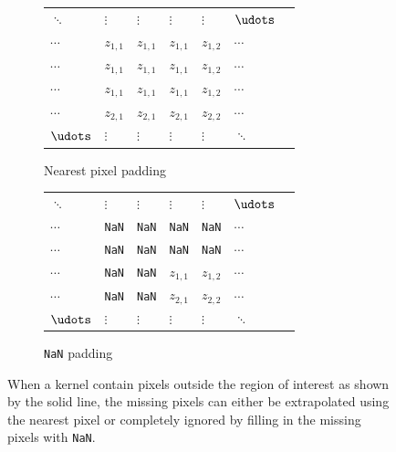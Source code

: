 \begin{figure}
	\centering
	\begin{subfigure}[b]{0.49\textwidth}
	    \begin{tabular}{lllllll}
	       $\ddots$ & $\vdots$ & $\vdots$ & $\vdots$ & $\vdots$ & $\udots$ \\
	       $\cdots$ & $z_{1,1}$ & $z_{1,1}$ & $z_{1,1}$ & $z_{1,2}$ & $\cdots$ \\
	       $\cdots$ & $z_{1,1}$ & $z_{1,1}$ & $z_{1,1}$ & $z_{1,2}$ & $\cdots$ \\ \cline{4-6}
	       $\cdots$ & $z_{1,1}$ & \multicolumn{1}{l|}{$z_{1,1}$} & $z_{1,1}$ & $z_{1,2}$ & $\cdots$ \\
	       $\cdots$ & $z_{2,1}$ & \multicolumn{1}{l|}{$z_{2,1}$}  & $z_{2,1}$ & $z_{2,2}$ & $\cdots$ \\
	       $\udots$ & $\vdots$ & \multicolumn{1}{l|}{$\vdots$}  & $\vdots$ & $\vdots$ & $\ddots$
		\end{tabular}
		\caption{Nearest pixel padding}
		\label{fig:inference_padding_nearest}
	\end{subfigure}
	\begin{subfigure}[b]{0.49\textwidth}
	    \begin{tabular}{lllllll}
	       $\ddots$ & $\vdots$ & $\vdots$ & $\vdots$ & $\vdots$ & $\udots$ \\
	       $\cdots$ & \texttt{NaN} & \texttt{NaN} & \texttt{NaN} & \texttt{NaN} & $\cdots$ \\
	       $\cdots$ & \texttt{NaN} & \texttt{NaN} & \texttt{NaN} & \texttt{NaN} & $\cdots$ \\ \cline{4-6}
	       $\cdots$ & \texttt{NaN} & \multicolumn{1}{l|}{\texttt{NaN}} & $z_{1,1}$ & $z_{1,2}$ & $\cdots$ \\
	       $\cdots$ & \texttt{NaN} & \multicolumn{1}{l|}{\texttt{NaN}}  & $z_{2,1}$ & $z_{2,2}$ & $\cdots$ \\
	       $\udots$ & $\vdots$ & \multicolumn{1}{l|}{$\vdots$}  & $\vdots$ & $\vdots$ & $\ddots$
		\end{tabular}
		\caption{\texttt{NaN} padding}
		\label{fig:inference_padding_nan}
	\end{subfigure}
	\caption{When a kernel contain pixels outside the region of interest as shown by the solid line, the missing pixels can either be extrapolated using the nearest pixel or completely ignored by filling in the missing pixels with \texttt{NaN}.}
	\label{fig:inference_padding}
\end{figure}

